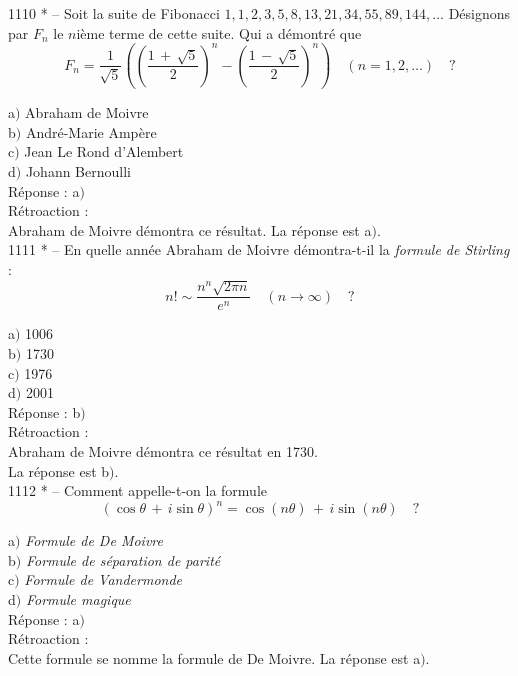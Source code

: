 ﻿\documentclass[letterpaper, 12pt]{article}
\begin{document}
1110 * -- Soit la suite de Fibonacci
$1,1,2,3,5,8,13,21,34,55,89,144, \ldots$ D\'esignons par $F_n$ le
$n$i\`eme terme de cette suite. Qui a d\'emontr\'e que
$$\displaystyle{F_n=\frac1{\sqrt5}\left(\left(\frac{1\,+\,\sqrt5}2\right)^n-\left(\frac{1\,-\,\sqrt5}2\right)^n\right)\quad(n=1,2,\ldots)}\quad?$$

a$)$ Abraham de Moivre \\
b$)$ Andr\'e-Marie Amp\`ere \\
c$)$ Jean Le Rond d'Alembert  \\
d$)$ Johann Bernoulli\\

R\'eponse : a$)$\\

R\'etroaction :\\
Abraham de Moivre d\'emontra ce r\'esultat.
La r\'eponse est a$)$.\\

1111 * -- En quelle ann\'ee Abraham de Moivre d\'emontra-t-il la
{\sl formule de Stirling} :
$$\displaystyle{n!\sim\frac{n^n\sqrt{2\pi n}}{e^n}\quad(n\to\infty)}\quad?$$

a$)$ 1006  \\
b$)$ 1730 \\
c$)$ 1976  \\
d$)$ 2001\\

R\'eponse : b$)$\\

R\'etroaction :\\
Abraham de Moivre d\'emontra ce r\'esultat en 1730. \\
La r\'eponse est b$)$.\\

1112 * -- Comment appelle-t-on la formule
$$(\cos\theta\,+\,i\sin\theta)^n=\cos(n\theta)\,+\,i\sin(n\theta)\quad?$$


a$)$ {\sl Formule de De Moivre} \\
b$)$ {\sl Formule de s\'eparation de parit\'e}  \\
c$)$ {\sl Formule de Vandermonde}  \\
d$)$ {\sl Formule magique}\\

R\'eponse : a$)$\\

R\'etroaction :\\
Cette formule se nomme la formule de De Moivre.
La r\'eponse est a$)$.\\
\end{document}
